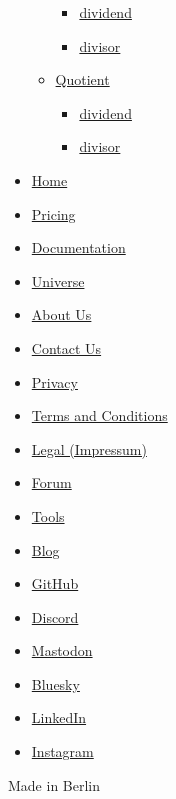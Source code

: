 \begin{itemize}
\begin{itemize}
    \begin{itemize}
    \tightlist
    \item
      \hyperref[functions-rem-euclid-dividend]{dividend}
    \item
      \hyperref[functions-rem-euclid-divisor]{divisor}
    \end{itemize}
  \item
    \hyperref[functions-quo]{Quotient}

    \begin{itemize}
    \tightlist
    \item
      \hyperref[functions-quo-dividend]{dividend}
    \item
      \hyperref[functions-quo-divisor]{divisor}
    \end{itemize}
  \end{itemize}
\end{itemize}

\begin{itemize}
\tightlist
\item
  \href{/}{Home}
\item
  \href{/pricing/}{Pricing}
\item
  \href{/docs/}{Documentation}
\item
  \href{/universe/}{Universe}
\item
  \href{/about/}{About Us}
\item
  \href{/contact/}{Contact Us}
\item
  \href{/privacy/}{Privacy}
\item
  \href{https://typst.app/terms}{Terms and Conditions}
\item
  \href{/legal/}{Legal (Impressum)}
\end{itemize}

\begin{itemize}
\tightlist
\item
  \href{https://forum.typst.app}{Forum}
\item
  \href{/tools/}{Tools}
\item
  \href{/blog/}{Blog}
\item
  \href{https://github.com/typst/}{GitHub}
\item
  \href{https://discord.gg/2uDybryKPe}{Discord}
\item
  \href{https://mastodon.social/@typst}{Mastodon}
\item
  \href{https://bsky.app/profile/typst.app}{Bluesky}
\item
  \href{https://www.linkedin.com/company/typst/}{LinkedIn}
\item
  \href{https://instagram.com/typstapp/}{Instagram}
\end{itemize}

Made in Berlin
